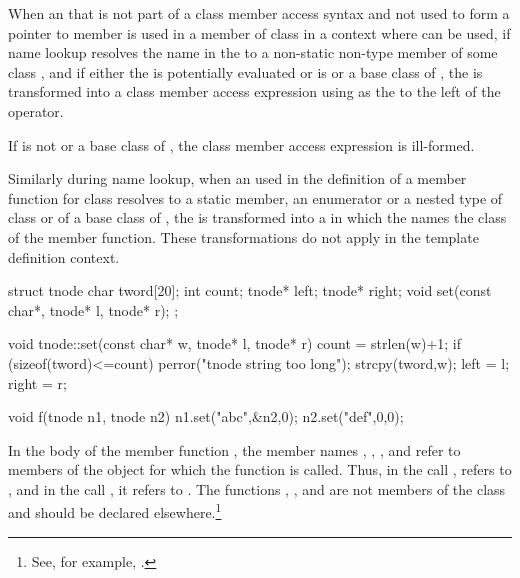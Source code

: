 \pnum
When an  that is not part of a
class member access syntax and not used to form a
pointer to member is used in
a member of class  in a context where  can be
used,
if name
lookup resolves the name in the
 to a non-static non-type member of some class
,
and if either the  is potentially evaluated or
 is  or a base class of ,
the  is transformed into a class
member access expression using
 as the 
to the left of the  operator.
\begin{note}
If  is not  or a base class of , the class
member access expression is ill-formed.
\end{note}
Similarly during name lookup, when an
 used in the definition of a
member function for class  resolves to a static member,
an enumerator or a nested type of class  or of a base class of
, the  is transformed into a
 in which the
 names the class of the member function.
These transformations do not apply in the
template definition context.
\begin{example}
\begin{codeblock}
struct tnode {
  char tword[20];
  int count;
  tnode* left;
  tnode* right;
  void set(const char*, tnode* l, tnode* r);
};

void tnode::set(const char* w, tnode* l, tnode* r) {
  count = strlen(w)+1;
  if (sizeof(tword)<=count)
      perror("tnode string too long");
  strcpy(tword,w);
  left = l;
  right = r;
}

void f(tnode n1, tnode n2) {
  n1.set("abc",&n2,0);
  n2.set("def",0,0);
}
\end{codeblock}

In the body of the member function , the member names
, , , and  refer to
members of the object for which the function is called. Thus, in the
call ,  refers to
, and in the call , it refers
to . The functions , , and
 are not members of the class  and should be
declared elsewhere.\footnote{See, for example, .}
\end{example}

